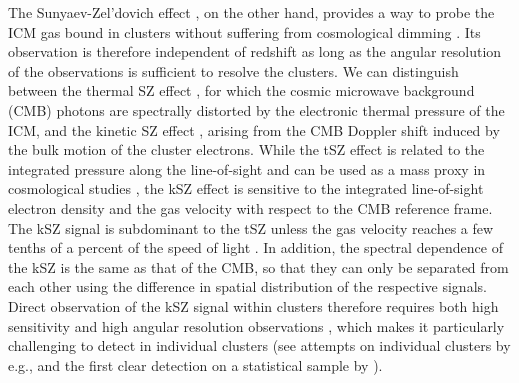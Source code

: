 \documentclass[twocolumn,traditabstract]{aa}
\begin{document}
The Sunyaev-Zel'dovich effect \citep[SZ,][]{Sunyaev1972}, on the other hand, provides a way to probe the ICM gas bound in clusters without suffering from cosmological dimming \citep{birkinshaw1999,carlstrom2002,kitayama2014}. Its observation is therefore independent of redshift as long as the angular resolution of the observations is sufficient to resolve the clusters. We can distinguish between the thermal SZ effect \citep[tSZ,][]{Sunyaev1972}, for which the cosmic microwave background (CMB) photons are spectrally distorted by the electronic thermal pressure of the ICM, and the kinetic SZ effect \citep[kSZ,][]{Sunyaev1980}, arising from the CMB Doppler shift induced by the bulk motion of the cluster electrons. While the tSZ effect is related to the integrated pressure along the line-of-sight and can be used as a mass proxy in cosmological studies \citep[see, e.g.,][]{Planck2015XXIV,Bleem2015,Hasselfield2013}, the kSZ effect is sensitive to the integrated line-of-sight electron density and the gas velocity with respect to the CMB reference frame. The kSZ signal is subdominant to the tSZ unless the gas velocity reaches a few tenths of a percent of the speed of light \citep[1000 km/s, see e.g.,][]{birkinshaw1999}. In addition, the spectral dependence of the kSZ is the same as that of the CMB, so that they can only be separated from each other using the difference in spatial distribution of the respective signals. Direct observation of the kSZ signal within clusters therefore requires both high sensitivity and high angular resolution observations \citep{Haehnelt1996}, which makes it particularly challenging to detect in individual clusters (see attempts on individual clusters by e.g., \citealt{Holzapfel1997,Benson2003,Sayers2015} and the first clear detection on a statistical sample by \citealt{Hand2012}). 
\end{document}
